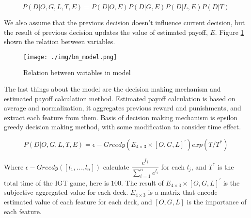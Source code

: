 \documentclass[12pt]{article}
\begin{document}
\[
	P(D | O, G, L, T, E) = P(D | O, E) P(D | G, E) P(D | L, E) P(D | T)
\]

We also assume that the previous decision doesn't influence current decision,
but the result of previous decision updates the value of estimated payoff, $ E
$. Figure \ref{fig:bn_model} shown the relation between variables.

\begin{figure}[b]
\caption{Relation between variables in model}
\label{fig:bn_model}
\centering
\texttt{[image: ./img/bn\_model.png]}
\end{figure}

The last things about the model are the decision making mechanism and estimated
payoff calculation method. Estimated payoff calculation is based on average and
normalization, it aggregates previous reward and punishments, and extract each
feature from them.  Basis of decision making mechanism is epsilon greedy
decision making method, with some modification to consider time effect.

\[
	P(D | O, G, L, T, E) = \epsilon-Greedy(E_{4 \times 3} \times [O, G, L]^{'}) exp(T/T^{*})
\]

Where $\epsilon-Greedy([l_1, \dots, l_n])$ calculate $\dfrac{e^{l_j}}{\sum_{i = 1}^{n} e^{l_i}}$ for each $l_j$, 
and $T^{*}$ is the total time of the IGT game, here is $100$.
The result of $E_{4 \times 3} \times [O, G, L]^{'}$ is the subjective aggregated value for each deck.
$E_{4 \times 3}$ is a matrix that encode estimated value of each feature for each deck, and $[O, G, L]$ is the 
importance of each feature.
\end{document}
